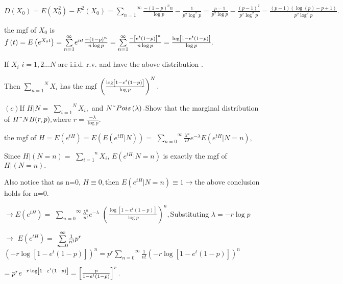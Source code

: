 \documentclass{article}
\begin{document}
$D\left( X_{0}\right) =E\left( X_{0}^{2}\right) -E^{2}\left( X_{0}\right) =%
\overset{\infty }{\underset{n=1}{\sum }}\frac{-\left( 1-p\right) ^{n}n}{\log
p}-\frac{1}{p^{2}\log ^{2}p}=\frac{p-1}{p^{2}\log p}-\frac{\left( p-1\right)
^{2}}{p^{2}\log ^{2}p}=\frac{\left( p-1\right) \left( \log \left( p\right)
-p+1\right) }{p^{2}\log ^{2}p}.$

the mgf of $X_{0}$ is $f\left( t\right) =E\left( e^{X_{0}t}\right) =\overset{%
\infty }{\underset{n=1}{\sum }}e^{nt}\frac{-\left( 1-p\right) ^{n}}{n\log p}=%
\overset{\infty }{\underset{n=1}{\sum }}\frac{-\left[ e^{t}\left( 1-p\right) %
\right] ^{n}}{n\log p}=\frac{\log \left[ 1-e^{t}\left( 1-p\right) \right] }{%
\log p}.$

If $X_{i}$ $i=1,2...N$ are i.i.d. r.v. and have the above distribution .

Then $\overset{N}{\underset{n=1}{\sum }}X_{i}$ has the mgf $\left( \frac{%
\log \left[ 1-e^{t}\left( 1-p\right) \right] }{\log p}\right) ^{N}.$

$\left( c\right) $If $H|N=$ $\overset{N}{\underset{i=1}{\sum }}X_{i},$ and $N%
\symbol{126}Pois\left( \lambda \right) .$Show that the marginal distribution
of $H\symbol{126}NB(r,p),$where $r=\frac{-\lambda }{\log p}.$

the mgf of $H=E\left( e^{tH}\right) =E\left( E\left( e^{tH}|N\right) \right)
=$ $\overset{\infty }{\underset{n=0}{\sum }}\frac{\lambda ^{n}}{n!}%
e^{-\lambda }E\left( e^{tH}|N=n\right) ,$

Since $H|\left( N=n\right) =$ $\overset{n}{\underset{i=1}{\sum }}X_{i}$, $%
E\left( e^{tH}|N=n\right) $ is exactly the mgf of $H|\left( N=n\right) .$

Also notice that as n=0, $H\equiv 0,$then $E\left( e^{tH}|N=n\right) \equiv
1\rightarrow $the above conclusion holds for n=0.

$\rightarrow E\left( e^{tH}\right) =$ $\overset{\infty }{\underset{n=0}{\sum 
}}\frac{\lambda ^{n}}{n!}e^{-\lambda }$ $\left( \frac{\log \left[
1-e^{t}\left( 1-p\right) \right] }{\log p}\right) ^{n},$Substituting $%
\lambda =-r\log p$

$\rightarrow $ $E\left( e^{tH}\right) =$ $\overset{\infty }{\underset{n=0}{%
\sum }}\frac{1}{n!}p^{r}$ $\left( -r\log \left[ 1-e^{t}\left( 1-p\right) %
\right] \right) ^{n}=p^{r}\overset{\infty }{\underset{n=0}{\sum }}\frac{1}{n!%
}\left( -r\log \left[ 1-e^{t}\left( 1-p\right) \right] \right) ^{n}$

$=p^{r}e^{-r\log \left[ 1-e^{t}\left( 1-p\right) \right] }=\left[ \frac{p}{%
1-e^{t}\left( 1-p\right) }\right] ^{r}.$
\end{document}
